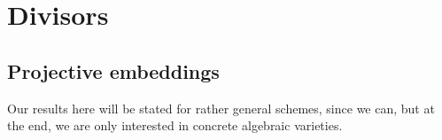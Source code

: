 \documentclass[a4paper]{article}
\begin{document}
%
%
%
%
\section{Divisors}
\subsection{Projective embeddings}
Our results here will be stated for rather general schemes, since we can, but at the end, we are only interested in concrete algebraic varieties.
\end{document}
